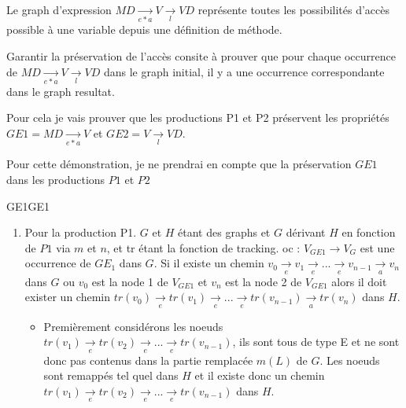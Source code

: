 \documentclass[a4paper, 12pt]{article}
\begin{document}
{  Le graph d'expression  \(MD \underset{e * a}{\rightarrow} V \underset{l}{\rightarrow}  VD\) représente toutes les possibilités d'accès possible à une variable depuis une définition de méthode.

  Garantir la préservation de l'accès consite à prouver que pour chaque occurrence de \(MD \underset{e * a}{\rightarrow} V \underset{l}{\rightarrow} VD\)
  dans le graph initial, il y a une occurrence correspondante dans le graph resultat.

  Pour cela je vais prouver que les productions P1 et P2 préservent les propriétés \(GE1 = MD \underset{e * a}{\rightarrow} V \) et  \(GE2 = V \underset{l}{\rightarrow}  VD\).

  Pour cette démonstration, je ne prendrai en compte que la préservation $GE1$ dans les productions $P1$ et $P2$

  \begin{myfig}{GE1}{GE1}
    \begin{center}
    \end{center}
  \end{myfig}

  \begin{enumerate}
    \item

    Pour la production P1. $G$ et $H$ étant des graphs et $G$ dérivant $H$ en fonction de $P1$ via $m$ et $n$, et tr étant la fonction de tracking. oc :  \( {V_{GE1}} {\rightarrow} {V_G} \) est une occurrence de  {$GE_1$} dans $G$.
    Si il existe un chemin \( v_0 \underset{e}{\rightarrow} v_1 \underset{e}{\rightarrow} ... \underset{e}{\rightarrow} v_{n-1} \underset{a}{\rightarrow} v_n \) dans $G$
    ou {$v_0$} est la node 1 de {$V_{GE1}$} et {$v_n$} est la node 2 de $V_{GE1}$
    alors il doit exister un chemin \( tr(v_0) \underset{e}{\rightarrow} tr(v_1) \underset{e}{\rightarrow} ... \underset{e}{\rightarrow} tr(v_{n-1}) \underset{a}{\rightarrow} tr({v_n}) \) dans $H$.
    \begin{itemize}[label=\textbullet]
      \item Premièrement considérons les noeuds $tr(v_1) \underset{e}{\rightarrow} tr(v_2) \underset{e}{\rightarrow} ... \underset{e}{\rightarrow} tr(v_{n-1})$,
      ils sont tous de type E et ne sont donc pas contenus dans la partie remplacée $m(L)$ de $G$.
      Les noeuds sont remappés tel quel dans $H$ et il existe donc un chemin $tr(v_1) \underset{e}{\rightarrow} tr(v_2) \underset{e}{\rightarrow} ... \underset{e}{\rightarrow} tr(v_{n-1})$ dans $H$.


\end{itemize}
\end{enumerate}}
\end{document}
